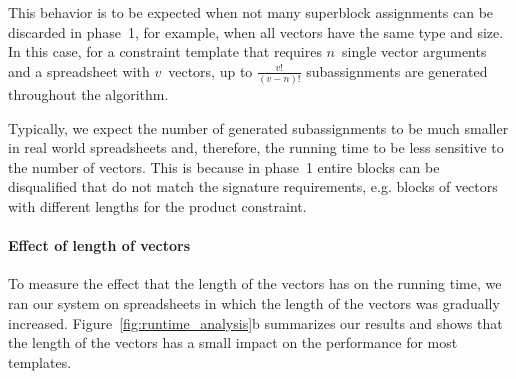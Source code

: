 This behavior is to be expected when not many superblock assignments can be discarded in phase~1, for example, when all vectors have the same type and size.
In this case, for a constraint template that requires $n$~single vector arguments and a spreadsheet with $v$~vectors, up to $\frac{v!}{(v - n)!}$ subassignments are generated throughout the algorithm.

Typically, we expect the number of generated subassignments to be much smaller in real world spreadsheets and, therefore, the running time to be less sensitive to the number of vectors.
This is because in phase~1 entire blocks can be disqualified that do not match the signature requirements, e.g. blocks of vectors with different lengths for the product constraint.





\paragraph{Effect of length of vectors}
To measure the effect that the length of the vectors has on the running time, we ran our system on spreadsheets in which the length of the vectors was gradually increased.
Figure~\ref{fig:runtime_analysis}b summarizes our results and shows that the length of the vectors has a small impact on the performance for most templates.


